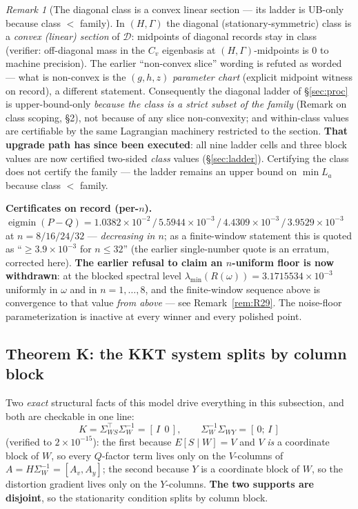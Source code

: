 \documentclass[11pt]{article}
\theoremstyle{definition}
\theoremstyle{remark}
\newtheorem{remark}{Remark}
\begin{document}
\begin{remark}[The diagonal class is a convex linear section ---
its ladder is UB-only because class $<$ family]
\label{rem:diagsection}
In $(H,\Gamma)$ the diagonal (stationary-symmetric) class is a
\emph{convex (linear) section} of $\mathcal D$: midpoints of
diagonal records stay in class (verifier: off-diagonal mass in the
$C_v$ eigenbasis at $(H,\Gamma)$-midpoints is $0$ to machine
precision). The earlier ``non-convex slice'' wording is refuted as
worded --- what is non-convex is the $(g,h,z)$ \emph{parameter
chart} (explicit midpoint witness on record), a different
statement. Consequently the diagonal ladder of
\S\ref{sec:proc} is upper-bound-only \emph{because the class is a
strict subset of the family} (Remark on class scoping,
\S2), not because of any slice non-convexity; and within-class
values are certifiable by the same Lagrangian machinery restricted
to the section. \textbf{That upgrade path has since been executed}:
all nine ladder cells and three block values are now certified
two-sided \emph{class} values (\S\ref{sec:ladder}). Certifying the
class does not certify the family --- the ladder remains an upper
bound on $\min L_a$ because class $<$ family.
\end{remark}

\medskip\noindent\textbf{Certificates on record (per-$n$).}
$\operatorname{eigmin}(P-Q)=1.0382\times10^{-2}\,/\,
5.5944\times10^{-3}\,/\,4.4309\times10^{-3}\,/\,
3.9529\times10^{-3}$ at $n=8/16/24/32$ --- \emph{decreasing in
$n$}; as a finite-window statement this is quoted as
``$\ge3.9\times10^{-3}$ for $n\le32$'' (the earlier single-number
quote is an erratum, corrected here). \textbf{The earlier refusal to
claim an $n$-uniform floor is now withdrawn}: at the blocked spectral
level $\lambda_{\min}(R(\omega))=3.1715534\times10^{-3}$ uniformly in
$\omega$ and in $n=1,\dots,8$, and the finite-window sequence above is
convergence to that value \emph{from above} --- see
Remark~\ref{rem:R29}. The noise-floor parameterization is
inactive at every winner and every polished point.

\subsection{Theorem K: the KKT system splits by column block}
\label{sec:K}
Two \emph{exact} structural facts of this model drive everything in
this subsection, and both are checkable in one line:
\[
K=\Sigma_{WS}^{\!\top}\Sigma_W^{-1}=[\,I\ \ 0\,],
\qquad
\Sigma_W^{-1}\Sigma_{WY}=[\,0;\,I\,]
\]
(verified to $2\times10^{-15}$): the first because $E[S\mid W]=V$ and
$V$ \emph{is} a coordinate block of $W$, so every $Q$-factor term lives
only on the $V$-columns of $A=H\Sigma_W^{-1}=[A_v,A_y]$; the second
because $Y$ is a coordinate block of $W$, so the distortion gradient
lives only on the $Y$-columns. \textbf{The two supports are disjoint},
so the stationarity condition splits by column block.
\end{document}
